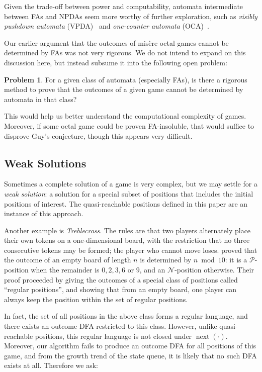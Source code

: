 \documentclass[11pt]{article}
\theoremstyle{definition}
\newtheorem{problem}{Problem}[section]
\theoremstyle{plain}
\newcommand{\varP}{\mathcal{P}}
\newcommand{\varN}{\mathcal{N}}
\newcommand{\nxt}{\operatorname{next}}
\begin{document}
Given the trade-off between power and computability, automata intermediate between FAs and NPDAs seem more worthy of further exploration,
such as \textit{visibly pushdown automata} (VPDA)~\cite{VPDA2004} and \textit{one-counter automata} (OCA)~\cite{OCA2018}.

Our earlier argument that the outcomes of misère octal games cannot be determined by FAs was not very rigorous.
We do not intend to expand on this discussion here, but instead subsume it into the following open problem:

\begin{problem}
    For a given class of automata (especially FAs), is there a rigorous method to prove that the outcomes of a given game cannot be determined by automata in that class?
\end{problem}

This would help us better understand the computational complexity of games.
Moreover, if some octal game could be proven FA-insoluble, that would suffice to disprove Guy's conjecture, though this appears very difficult.

\subsection{Weak Solutions}

Sometimes a complete solution of a game is very complex, but we may settle for a \textit{weak solution}: a solution for a special subset of positions that includes the initial positions of interest.
The quasi-reachable positions defined in this paper are an instance of this approach.

Another example is \textit{Treblecross}. The rules are that two players alternately place their own tokens on a one-dimensional board, with the restriction that no three consecutive tokens may be formed; the player who cannot move loses.
\cite{2026TrebleCross} proved that the outcome of an empty board of length $n$ is determined by $n \bmod 10$: it is a $\varP$-position when the remainder is $0,2,3,6$ or $9$, and an $\varN$-position otherwise.
Their proof proceeded by giving the outcomes of a special class of positions called ``regular positions'', and showing that from an empty board, one player can always keep the position within the set of regular positions.

In fact, the set of all positions in the above class forms a regular language, and there exists an outcome DFA restricted to this class.
However, unlike quasi-reachable positions, this regular language is not closed under $\nxt(\cdot)$.
Moreover, our algorithm fails to produce an outcome DFA for all positions of this game, and from the growth trend of the state queue, it is likely that no such DFA exists at all.
Therefore we ask:
\end{document}
